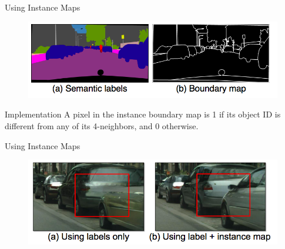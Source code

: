 \documentclass{beamer}
\begin{document}
\begin{frame}{Using Instance Maps}
\begin{figure}
	\centering
	\includegraphics[height=0.45\textheight]{images/instance_maps}
\end{figure}
%
%
\begin{beamerboxesrounded}[upper=uppercol,lower=lowercol,shadow=false]{Implementation }
A pixel in the instance boundary map is 1 if its object ID is different from any of its 4-neighbors, and 0 otherwise.
\end{beamerboxesrounded}
\end{frame}

\begin{frame}{Using Instance Maps}
\begin{figure}
	\centering
	\includegraphics[height=0.45\textheight]{images/instance_result}
\end{figure}
\end{frame}
\end{document}
